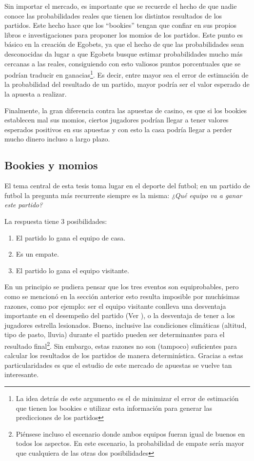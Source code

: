 Sin importar el mercado, es importante que se recuerde el hecho de que nadie conoce las probabilidades reales que tienen los distintos resultados de los partidos. Este hecho hace que los ``bookies'' tengan que confiar en sus propios libros e investigaciones para proponer los momios de los partidos. Este punto es básico en la creación de Egobets, ya que el hecho de que las probabilidades sean desconocidas da lugar a que Egobets busque estimar probabilidades mucho más cercanas a las reales, consiguiendo con esto valiosos puntos porcentuales que se podrían traducir en ganacias\footnote{La idea detrás de este argumento es el de minimizar el error de estimación que tienen los bookies e utilizar esta información para generar las predicciones de los partidos}. Es decir, entre mayor sea el error de estimación de la probabilidad del resultado de un partido, mayor podría ser el valor esperado de la apuesta a realizar. 

Finalmente, la gran diferencia contra las apuestas de casino, es que si los bookies establecen mal sus momios, ciertos jugadores podrían llegar a tener valores esperados positivos en sus apuestas y con esto la casa podría llegar a perder mucho dinero incluso a largo plazo.



\subsection{Bookies y momios}

El tema central de esta tesis toma lugar en el deporte del futbol; en un partido de futbol la pregunta más recurrente siempre es la misma: \emph{¿Qué equipo va a ganar este partido?}

La respuesta tiene $3$ posibilidades:
\begin{enumerate}
	\item El partido lo gana el equipo de casa.
	\item Es un empate.
	\item El partido lo gana el equipo visitante.
\end{enumerate}
En un principio se pudiera pensar que los tres eventos son equiprobables, pero como se mencionó en la sección anterior esto resulta imposible por muchísimas razones, como por ejemplo: ser el equipo visitante conlleva una desventaja importante en el desempeño del partido (Ver \cite{roffe2007crisis}), o la desventaja de tener a los jugadores estrella lesionados. Bueno, inclusive las condiciones climáticas (altitud, tipo de pasto, lluvia) durante el partido pueden ser determinantes para el resultado final\footnote{Piénsese incluso el escenario donde ambos equipos fueran igual de buenos en todos los aspectos. En este escenario, la probabilidad de empate sería mayor que cualquiera de las otras dos posibilidades}. Sin embargo, estas razones no son (tampoco) suficientes para calcular los resultados de los partidos de manera determinística. Gracias a estas particularidades es que el estudio de este mercado de apuestas se vuelve tan interesante.

